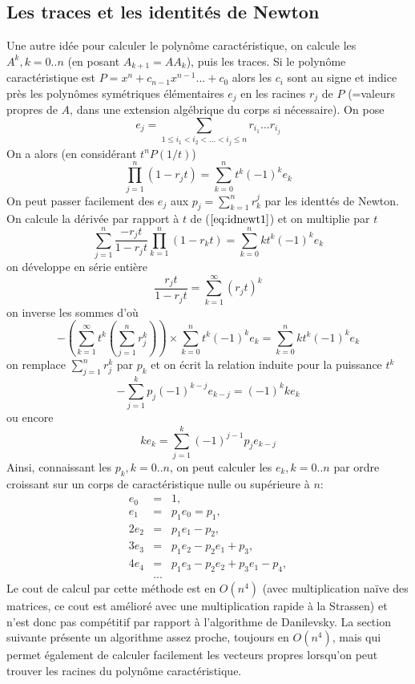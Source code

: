 \documentclass[a4paper,11pt]{book}
\begin{document}
\begin{giacjshere}
\subsection{Les traces et les identit\'es de Newton}
Une autre id\'ee pour calculer le polyn\^ome caract\'eristique,
on calcule les $A^k, k=0..n$ (en posant $A_{k+1}=AA_k$), puis les
traces. Si le polyn\^ome caract\'eristique est $P=x^n+c_{n-1}x^{n-1}...+c_0$
alors les $c_i$ sont au signe et indice pr\`es les polyn\^omes
sym\'etriques \'el\'ementaires $e_j$ en les racines $r_j$ de $P$  
(=valeurs propres de $A$, dans une extension
alg\'ebrique du corps si n\'ecessaire). On pose
$$ e_j=\sum_{1\leq i_1<i_2<...<i_j\leq n} r_{i_1}...r_{i_j} $$
On a alors (en consid\'erant $t^nP(1/t)$)
\begin{equation}\label{eq:idnewt1}
\prod_{j=1}^n(1-r_jt)=\sum_{k=0}^n t^k (-1)^k e_k
\end{equation}
On peut passer facilement des $e_j$ aux $ p_j=\sum_{k=1}^n r_k^j$ par
les identt\'es de Newton. On calcule la d\'eriv\'ee par rapport \`a $t$
de (\(\ref{eq:idnewt1}\)) et on multiplie par $t$
$$ \sum_{j=1}^n \frac{-r_jt}{1-r_jt} \prod_{k=1}^n(1-r_kt) 
=\sum_{k=0}^n kt^k (-1)^k e_k  $$
on d\'eveloppe en s\'erie enti\`ere 
$$\frac{r_jt}{1-r_jt}=\sum_{k=1}^\infty (r_jt)^k$$
on inverse les sommes d'o\`u
$$ -\left(\sum_{k=1}^\infty t^k (\sum_{j=1}^n r_j^k) \right) 
\times \sum_{k=0}^n t^k (-1)^k e_k = \sum_{k=0}^n k t^k (-1)^k e_k$$
on remplace $\sum_{j=1}^n r_j^k$ par $p_k$ et
on \'ecrit la relation induite pour la puissance $t^k$
$$ -\sum_{j=1}^k p_j (-1)^{k-j} e_{k-j} =(-1)^k ke_k$$
ou encore
$$ ke_k=\sum_{j=1}^k  (-1)^{j-1} p_j e_{k-j}$$
Ainsi, connaissant les $p_k, k=0..n$, 
on peut calculer les $e_k,k=0..n$ par ordre croissant sur un corps
de caract\'eristique nulle ou sup\'erieure \`a $n$:
\begin{eqnarray*}
 e_0&=&1, \\ 
e_1&=&p_1e_0=p_1, \\ 
2e_2&=&p_1e_1-p_2,\\
3e_3&=&p_1e_2-p_2e_1+p_3, \\
4e_4&=& p_1e_3-p_2e_2+p_3e_1-p_4, \\
&...&
\end{eqnarray*}
Le cout de calcul par cette m\'ethode est en $O(n^4)$ 
(avec multiplication na\"ive
des matrices, ce cout est am\'elior\'e avec une multiplication
rapide \`a la Strassen) 
et n'est donc pas comp\'etitif par rapport \`a 
l'algorithme de Danilevsky. La section suivante pr\'esente un
algorithme assez proche, toujours en $O(n^4)$, mais qui permet 
\'egalement de calculer facilement les vecteurs propres lorsqu'on
peut trouver les racines du polyn\^ome caract\'eristique.


\end{giacjshere}
\end{document}
